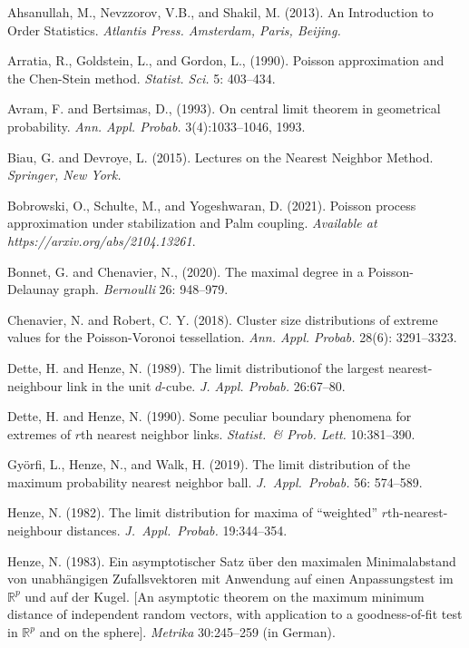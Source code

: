 \documentclass{article}
\theoremstyle{thm}
\theoremstyle{definition}
\theoremstyle{definition}
\theoremstyle{def}
\newcommand{\RR}{\mathbb{R}} %
\begin{document}
\begin{thebibliography}{1}


Ahsanullah, M., Nevzzorov, V.B., and Shakil, M. (2013). An {I}ntroduction to {O}rder {S}tatistics. \textit{Atlantis Press. Amsterdam, Paris, Beijing.}


Arratia, R., Goldstein, L., and Gordon, L., (1990).
Poisson approximation and the {C}hen-{S}tein method.
\textit{Statist. Sci.} 5: 403--434.

{
Avram, F. and Bertsimas, D., (1993). On central limit theorem in geometrical probability. \textit{Ann. Appl. Probab.} 3(4):1033–1046, 1993.
}


Biau, G. and Devroye, L. (2015). Lectures on the Nearest Neighbor Method. {\em Springer, New
York.}

{
Bobrowski, O., Schulte, M., and Yogeshwaran, D. (2021). Poisson process approximation under stabilization and Palm coupling. \textit{Available at https://arxiv.org/abs/2104.13261}.}


Bonnet, G. and Chenavier, N., (2020).
The maximal degree in a {P}oisson-{D}elaunay graph.
\textit{Bernoulli} 26: 948--979.


Chenavier, N. and Robert, C. Y. (2018).
Cluster size distributions of extreme values for the {P}oisson-{V}oronoi tessellation.
\textit{Ann. Appl. Probab.} 28(6): 3291--3323.


Dette, H. and Henze, N. (1989). The limit distributionof the largest nearest-neighbour link in the unit $d$-cube.
\textit{J. Appl. Probab.}  26:67--80.

Dette, H. and Henze, N. (1990). Some peculiar boundary phenomena for extremes of $r$th nearest neighbor links.
\textit{Statist.\ \& Prob. Lett.}  10:381--390.


Gy\"orfi, L., Henze, N., and Walk, H. (2019).
 The limit distribution of the maximum probability nearest neighbor ball.
\textit{J.\ Appl.\ Probab.} 56: 574--589.

Henze, N. (1982). The limit distribution for maxima of ``weighted'' $r$th-nearest-neighbour distances.
\textit{J.\ Appl.\ Probab.} 19:344--354.


Henze, N.	(1983).  Ein asymptotischer Satz \"uber den maximalen Minimalabstand von unabh\"angigen Zufallsvektoren mit Anwendung auf einen
Anpassungstest im $\RR^p$ und auf der Kugel. [An asymptotic theorem on the maximum minimum distance of independent random vectors,
with application to a goodness-of-fit test in $\mathbb{R}^p$ and on the sphere].
	\textit{Metrika} 30:245--259 (in German).


\end{thebibliography}
\end{document}
